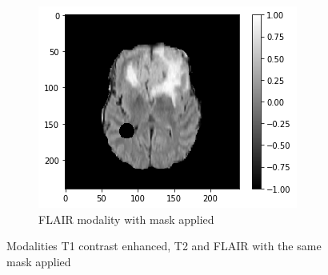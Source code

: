 \begin{figure}[H]
        \begin{subfigure}{.33\textwidth}
        \centering
        \includegraphics[width=\linewidth]{chapters/06_hdm/images_masked/masked_3.png}
        \caption{FLAIR modality with mask applied}
    \end{subfigure}
    \caption{Modalities T1 contrast enhanced, T2 and FLAIR with the same mask applied}
\end{figure}